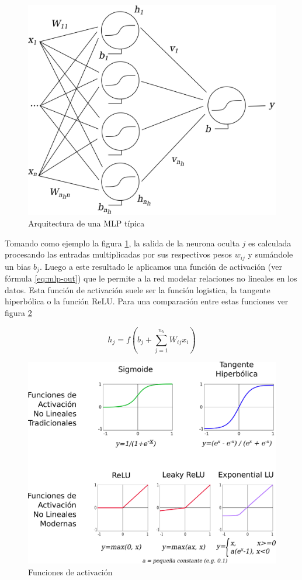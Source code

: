 \begin{figure}[htbp]
    \centering
    \includegraphics[width=0.6\linewidth]{graficos/propios/mlp.png}
    \caption{Arquitectura de una MLP típica \citep{bouzgou2012advanced}}
    \label{fig:mlp-eg}
\end{figure}

Tomando como ejemplo la figura \ref{fig:mlp-eg}, la salida de la neurona oculta $j$ es calculada procesando las entradas multiplicadas por sus respectivos pesos $w_{ij}$ y sumándole un bias $b_j$. Luego a este resultado le aplicamos una función de activación (ver fórmula \ref{eq:mlp-out}) que le permite a la red modelar relaciones no lineales en los datos. Esta función de activación suele ser la función logistica, la tangente hiperbólica o la función \ac{ReLU}. Para una comparación entre estas funciones ver figura \ref{fig:mlp-activation}

\begin{equation}
    \label{eq:mlp-out}
    h_j = f(b_j + \sum_{j=1}^{n_h} W_{ij} x_i)
\end{equation}

\begin{figure}[htbp]
    \centering
    \includegraphics[width=0.8\linewidth]{graficos/propios/funciones_de_activacion.png}
    \caption{Funciones de activación \citep{sze2017efficient}}
    \label{fig:mlp-activation}
\end{figure}

